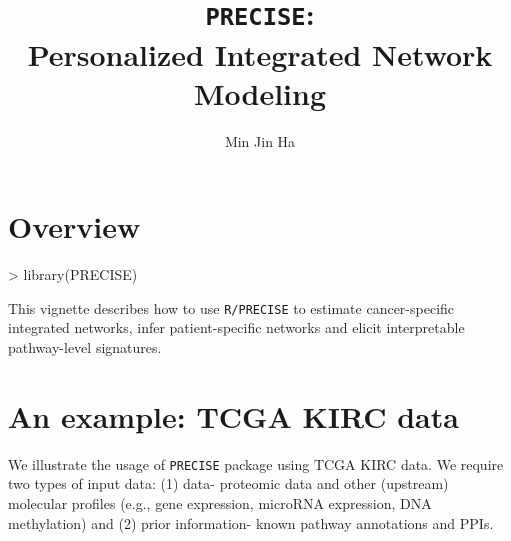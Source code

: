 \documentclass{article}
\begin{document}



\title{\texttt{PRECISE}:\\ Personalized Integrated Network Modeling}
\author{Min Jin Ha}
\maketitle

\title{}
\author{}
\maketitle

\section{Overview}
\begin{Schunk}
\begin{Sinput}
> library(PRECISE)
\end{Sinput}
\end{Schunk}
This vignette describes how to use \texttt{R/PRECISE} to estimate cancer-specific integrated networks, infer patient-specific networks and elicit interpretable pathway-level signatures.%
\section{An example: TCGA KIRC data}
We illustrate the usage of \texttt{PRECISE} package using TCGA KIRC data. We require two types of input data: (1) data- proteomic data and other (upstream) molecular profiles (e.g., gene expression, microRNA expression, DNA methylation) and (2) prior information- known pathway annotations and PPIs.
\end{document}
